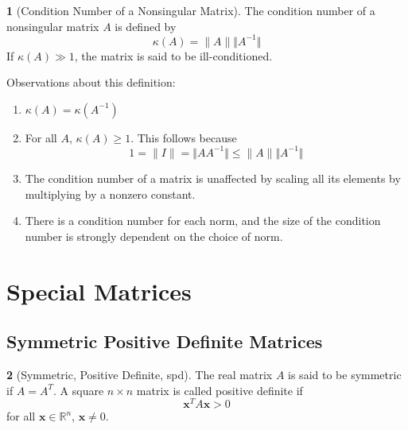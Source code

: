 \documentclass[12pt]{article}
\theoremstyle{definition}
\newtheorem{definition}{\color{NavyBlue}{\textbf{Definition}}}
\newcommand{\R}{\mathbb{R}}
\newcommand{\norm}[1]{\lVert#1\rVert}
\newcommand{\x}{\bm{x}}
\theoremstyle{definition}
\begin{document}
\begin{definition}[Condition Number of a Nonsingular Matrix]
The condition number of a nonsingular matrix $A$ is defined by 
\begin{equation}
	\kappa(A) = \norm{A} \Vert A^{-1} \Vert
\end{equation}
If $\kappa(A) \gg 1$, the matrix is said to be ill-conditioned.
\end{definition}
Observations about this definition:
\begin{enumerate}
	\item $\kappa(A) = \kappa(A^{-1})$ 
	\item For all $A$, $\kappa(A) \geq 1$. This follows because
	\begin{equation}
		1 = \norm{I} = \Vert A A^{-1} \Vert \leq \norm{A} \Vert A^{-1} \Vert
	\end{equation}
	\item The condition number of a matrix is unaffected by scaling all its elements by multiplying by a nonzero constant.
	\item There is a condition number for each norm, and the size of the condition number is strongly dependent on the choice of norm.
\end{enumerate}

\section{Special Matrices}
\subsection{Symmetric Positive Definite Matrices }
\begin{definition}[Symmetric, Positive Definite, spd]
The real matrix $A$ is said to be symmetric if $A = A^T$. A square $n \times n$ matrix is called positive definite if 
\begin{equation}
 	\x^T A \x > 0
\end{equation}
for all $\x \in \R^n$, $\x \neq 0$. 
\end{definition}
\end{document}
